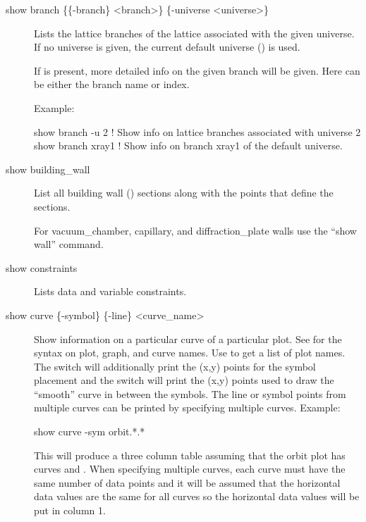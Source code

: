 {{{\begin{description}
\item[show branch \{\{-branch\} <branch>\} \{-universe <universe>\}] \Newline

\vskip -0.2in

Lists the lattice branches of the lattice associated with the given universe.
If no universe is given, the current default universe () is used.

If  is present, more detailed info on the given branch
will be given. Here  can be either the branch name or index.

Example:
\begin{example}
  show branch -u 2     ! Show info on lattice branches associated with universe 2
  show branch xray1    ! Show info on branch xray1 of the default universe.
\end{example}


\item[show building_wall] \Newline

\vskip -0.2in 

List all building wall () sections
along with the points that define the sections. 

For vacuum_chamber, capillary, and diffraction_plate walls use the
``show wall'' command.


\item[show constraints] \Newline

\vskip -0.2in

Lists data and variable constraints.


\item[show curve \{-symbol\} \{-line\} <curve\_name>] \Newline

\vskip -0.2in

Show information on a particular curve of a particular plot. See
 for the syntax on plot, graph, and curve names.  Use
 to get a list of plot names. The  switch
will additionally print the (x,y) points for the symbol placement and
the  switch will print the (x,y) points used to draw the
``smooth'' curve in between the symbols. The line or symbol points
from multiple curves can be printed by specifying multiple curves. Example:
\begin{example}
  show curve -sym orbit.*.*
\end{example}
This will produce a three column table assuming that the orbit plot
has curves  and . When specifying
multiple curves, each curve must have the same number of data points
and it will be assumed that the horizontal data values are the same
for all curves so the horizontal data values will be put in column 1.


\end{description}}}}
